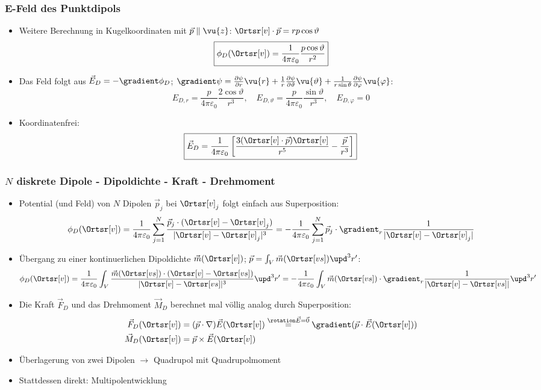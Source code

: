  \begin{frame}
    \frametitle{E-Feld des Punktdipols}
    \begin{itemize}[<+->]
    \item Weitere Berechnung in Kugelkoordinaten mit $\vec{p}\parallel\vu{z}$: $\Ortsr[v]\cdot\vec{p} = r p \cos\vartheta$
      $$
    \boxed{\phi_D(\Ortsr[v]) = \frac{1}{4\pi\varepsilon_0} \frac{p\cos\vartheta}{r^2} }
    $$
  \item Das Feld folgt aus $\vec{E}_D = -\gradient \phi_D $; $\gradient\psi = \frac{\partial\psi}{\partial r}\vu{r} + \frac{1}{r} \frac{\partial\psi}{\partial \vartheta}\vu{\vartheta} + \frac{1}{r\sin\theta} \frac{\partial\psi}{\partial \varphi}\vu{\varphi}$:
    $$
    \boxed{E_{D,r} = \frac{p}{4\pi\varepsilon_0} \frac{2\cos\vartheta}{r^3}, \quad E_{D,\vartheta} = \frac{p}{4\pi\varepsilon_0} \frac{\sin\vartheta}{r^3}, \quad E_{D,\varphi} = 0 }
    $$
  \item Koordinatenfrei:
    $$
    \boxed{\vec{E}_{D} = \frac{1}{4\pi\varepsilon_0}\left[ \frac{3(\Ortsr[v]\cdot\vec{p}) \Ortsr[v]}{r^5} -\frac{\vec{p}}{r^3} \right]}    
    $$
      \end{itemize}
    \end{frame}

    \begin{frame}
      \frametitle{$N$ diskrete Dipole - Dipoldichte - Kraft - Drehmoment}
      \begin{itemize}[<+->]
        \item Potential (und Feld) von $N$ Dipolen $\vec{p}_j$ bei $\Ortsr[v]_j$ folgt einfach aus Superposition:
        $$
        \phi_D(\Ortsr[v]) = \frac{1}{4\pi\varepsilon_0} \sum_{j=1}^N \frac{\vec{p}_j\cdot ( \Ortsr[v]-\Ortsr[v]_j)}{|\Ortsr[v]-\Ortsr[v]_j|^3} = -\frac{1}{4\pi\varepsilon_0} \sum_{j=1}^N \vec{p}_j\cdot \gradient_r \frac{1}{|\Ortsr[v]-\Ortsr[v]_j|}   
        $$
      \item Übergang zu einer kontinuerlichen \alert{Dipoldichte} $\vec{m}(\Ortsr[v])$; $\vec{p} = \int_V \vec{m}(\Ortsr[vs])\upd^3 r'$:
        $$
        \phi_D(\Ortsr[v]) = \frac{1}{4\pi\varepsilon_0} \int_V \frac{\vec{m}(\Ortsr[vs])\cdot ( \Ortsr[v]-\Ortsr[vs])}{|\Ortsr[v]-\Ortsr[vs]|^3} \upd^3 r'= -\frac{1}{4\pi\varepsilon_0} \int_V \vec{m}(\Ortsr[vs])\cdot \gradient_r \frac{1}{|\Ortsr[v]-\Ortsr[vs]|}  \upd^3 r'  
        $$
      \item Die \alert{Kraft} $\vec{F}_D$ und das \alert{Drehmoment} $\vec{M}_D$ berechnet mal völlig analog durch Superposition:
        \begin{align*}
          \vec{F}_D(\Ortsr[v]) &= (\vec{p}\cdot\nabla) \vec{E}(\Ortsr[v]) \stackrel{\rotation\vec{E}=\vec{0}}{=} \gradient(\vec{p}\cdot \vec{E}(\Ortsr[v]))\\
          \vec{M}_D(\Ortsr[v]) &= \vec{p} \times \vec{E}(\Ortsr[v])
        \end{align*}
      \item Überlagerung von zwei Dipolen $\to$ \alert{Quadrupol} mit \alert{Quadrupolmoment}
        \item Stattdessen direkt: \alert{Multipolentwicklung}
        \end{itemize}
      \end{frame}

